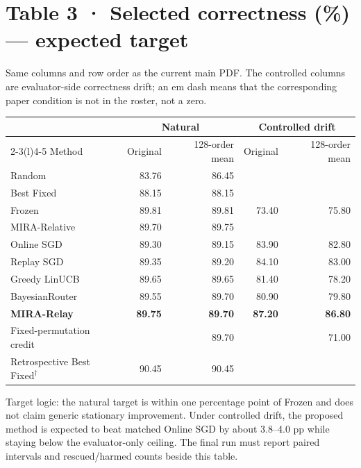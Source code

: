 \documentclass[10pt]{article}
\newcommand{\notrun}{\textemdash}
\newcommand{\targetcell}[1]{\textbf{#1}}
\newcommand{\smallnote}[1]{{\footnotesize\color{Gray}#1}}
\begin{document}
\clearpage
\section*{Table 3 · Selected correctness (\%) — expected target}
\smallnote{Same columns and row order as the current main PDF. The controlled columns are evaluator-side correctness drift; an em dash means that the corresponding paper condition is not in the roster, not a zero.}
\begin{tabularx}{\linewidth}{@{}lrrrr@{}}
\toprule
& \multicolumn{2}{c}{Natural} & \multicolumn{2}{c}{Controlled drift} \\
\cmidrule(lr){2-3}\cmidrule(l){4-5}
Method & Original & 128-order mean & Original & 128-order mean \\
\midrule
Random & 83.76 & 86.45 & \notrun & \notrun \\
Best Fixed & 88.15 & 88.15 & \notrun & \notrun \\
Frozen & 89.81 & 89.81 & 73.40 & 75.80 \\
MIRA-Relative & 89.70 & 89.75 & \notrun & \notrun \\
\midrule
Online SGD & 89.30 & 89.15 & 83.90 & 82.80 \\
Replay SGD & 89.35 & 89.20 & 84.10 & 83.00 \\
Greedy LinUCB & 89.65 & 89.65 & 81.40 & 78.20 \\
BayesianRouter & 89.55 & 89.70 & 80.90 & 79.80 \\
\textbf{MIRA-Relay} & \targetcell{89.75} & \targetcell{89.70} & \targetcell{87.20} & \targetcell{86.80} \\
\midrule
Fixed-permutation credit & \notrun & 89.70 & \notrun & 71.00 \\
\midrule
Retrospective Best Fixed$^{\dagger}$ & 90.45 & 90.45 & \notrun & \notrun \\
\bottomrule
\end{tabularx}
\smallnote{Target logic: the natural target is within one percentage point of Frozen and does not claim generic stationary improvement. Under controlled drift, the proposed method is expected to beat matched Online SGD by about 3.8--4.0 pp while staying below the evaluator-only ceiling. The final run must report paired intervals and rescued/harmed counts beside this table.}
\end{document}
